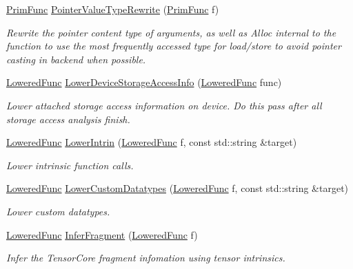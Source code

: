 \begin{DoxyCompactItemize}
\hyperlink{classtvm_1_1tir_1_1PrimFunc}{Prim\+Func} \hyperlink{namespacetvm_1_1tir_abbf2681c6850628b3c9b213298f056b3}{Pointer\+Value\+Type\+Rewrite} (\hyperlink{classtvm_1_1tir_1_1PrimFunc}{Prim\+Func} f)
\begin{DoxyCompactList}\small\item\em Rewrite the pointer content type of arguments, as well as Alloc internal to the function to use the most frequently accessed type for load/store to avoid pointer casting in backend when possible. \end{DoxyCompactList}\item 
\hyperlink{classtvm_1_1tir_1_1LoweredFunc}{Lowered\+Func} \hyperlink{namespacetvm_1_1tir_afcbd367b40fe2cd31d101c88a63a0b25}{Lower\+Device\+Storage\+Access\+Info} (\hyperlink{classtvm_1_1tir_1_1LoweredFunc}{Lowered\+Func} func)
\begin{DoxyCompactList}\small\item\em Lower attached storage access information on device. Do this pass after all storage access analysis finish. \end{DoxyCompactList}\item 
\hyperlink{classtvm_1_1tir_1_1LoweredFunc}{Lowered\+Func} \hyperlink{namespacetvm_1_1tir_adb8b5d13c11411299808c564adda2713}{Lower\+Intrin} (\hyperlink{classtvm_1_1tir_1_1LoweredFunc}{Lowered\+Func} f, const std\+::string \&target)
\begin{DoxyCompactList}\small\item\em Lower intrinsic function calls. \end{DoxyCompactList}\item 
\hyperlink{classtvm_1_1tir_1_1LoweredFunc}{Lowered\+Func} \hyperlink{namespacetvm_1_1tir_ac8725d2ad12962353ec11b6285cc6b3d}{Lower\+Custom\+Datatypes} (\hyperlink{classtvm_1_1tir_1_1LoweredFunc}{Lowered\+Func} f, const std\+::string \&target)
\begin{DoxyCompactList}\small\item\em Lower custom datatypes. \end{DoxyCompactList}\item 
\hyperlink{classtvm_1_1tir_1_1LoweredFunc}{Lowered\+Func} \hyperlink{namespacetvm_1_1tir_acd928ded601486ae3a3b787df3f09688}{Infer\+Fragment} (\hyperlink{classtvm_1_1tir_1_1LoweredFunc}{Lowered\+Func} f)
\begin{DoxyCompactList}\small\item\em Infer the Tensor\+Core fragment infomation using tensor intrinsics. \end{DoxyCompactList}\item 

\end{DoxyCompactItemize}
